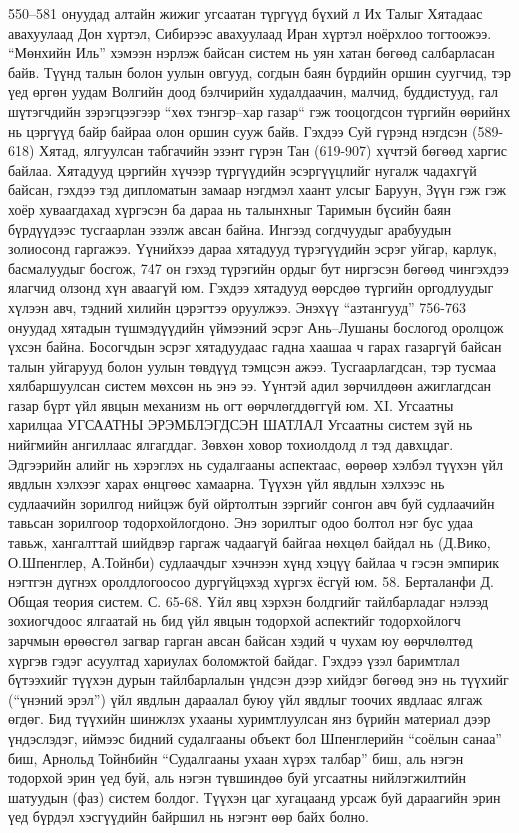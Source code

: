 550–581 онуудад алтайн жижиг угсаатан түргүүд бүхий л Их Талыг Хятадаас авахуулаад Дон хүртэл, Сибирээс авахуулаад Иран хүртэл ноёрхлоо тогтоожээ. “Мөнхийн Иль” хэмээн нэрлэж байсан систем нь уян хатан бөгөөд салбарласан байв. Түүнд талын болон уулын овгууд, согдын баян бүрдийн оршин суугчид, тэр үед өргөн уудам Волгийн доод бэлчирийн худалдаачин, малчид, буддистууд, гал шүтэгчдийн зэрэгцээгээр “хөх тэнгэр–хар газар“ гэж тооцогдсон түргийн өөрийнх нь цэргүүд байр байраа олон оршин сууж байв. Гэхдээ Суй гүрэнд нэгдсэн (589-618) Хятад, ялгуулсан табгачийн эзэнт гүрэн Тан (619-907) хүчтэй бөгөөд харгис байлаа. Хятадууд цэргийн хүчээр түргүүдийн эсэргүүцлийг нугалж чадахгүй байсан, гэхдээ тэд дипломатын замаар нэгдмэл хаант улсыг Баруун, Зүүн гэж гэж хоёр хуваагдахад хүргэсэн ба дараа нь талынхныг Таримын бүсийн баян бүрдүүдээс тусгаарлан эзэлж авсан байна. Ингээд согдчуудыг арабуудын золиосонд гаргажээ. Үүнийхээ дараа хятадууд түрэгүүдийн эсрэг уйгар, карлук, басмалуудыг босгож, 747 он гэхэд түрэгийн ордыг бут ниргэсэн бөгөөд чингэхдээ ялагчид олзонд хүн аваагүй юм. Гэхдээ хятадууд өөрсдөө түргийн оргодлуудыг хүлээн авч, тэдний хилийн цэрэгтээ оруулжээ. Энэхүү “азтангууд” 756-763 онуудад хятадын түшмэдүүдийн үймээний эсрэг Ань–Лушаны бослогод оролцож үхсэн байна. Босогчдын эсрэг хятадуудаас гадна хаашаа ч гарах газаргүй байсан талын уйгарууд болон уулын төвдүүд тэмцсэн ажээ. Тусгаарлагдсан, тэр тусмаа хялбаршуулсан систем мөхсөн нь энэ ээ. Үүнтэй адил зөрчилдөөн ажиглагдсан газар бүрт үйл явцын механизм нь огт өөрчлөгддөггүй юм.
XI. Угсаатны харилцаа
УГСААТНЫ ЭРЭМБЛЭГДСЭН ШАТЛАЛ
Угсаатны систем зүй нь нийгмийн ангиллаас ялгагддаг. Зөвхөн ховор тохиолдолд л тэд давхцдаг. Эдгээрийн алийг нь хэрэглэх нь судалгааны аспектаас, өөрөөр хэлбэл түүхэн үйл явдлын хэлхээг харах өнцгөөс хамаарна. Түүхэн үйл явдлын хэлхээс нь судлаачийн зорилгод нийцэж буй ойртолтын зэргийг сонгон авч буй судлаачийн тавьсан зорилгоор тодорхойлогдоно. Энэ зорилтыг одоо болтол нэг бус удаа тавьж, хангалттай шийдвэр гаргаж чадаагүй байгаа нөхцөл байдал нь (Д.Вико, О.Шпенглер, А.Тойнби) судлаачдыг хэчнээн хүнд хэцүү байлаа ч гэсэн эмпирик нэгтгэн дүгнэх оролдлогоосоо дургүйцэхэд хүргэх ёсгүй юм. 58. Берталанфи Д. Общая теория систем. С. 65-68.
Үйл явц хэрхэн болдгийг тайлбарладаг нэлээд зохиогчдоос ялгаатай нь бид үйл явцын тодорхой аспектийг тодорхойлогч зарчмын өрөөсгөл загвар гарган авсан байсан хэдий ч чухам юу өөрчлөлтөд хүргэв гэдэг асуултад хариулах боломжтой байдаг. Гэхдээ үзэл баримтлал бүтээхийг түүхэн дурын тайлбарлалын үндсэн дээр хийдэг бөгөөд энэ нь түүхийг (“үнэний эрэл”) үйл явдлын дараалал буюу үйл явдлыг тоочих явдлаас ялгаж өгдөг. Бид түүхийн шинжлэх ухааны хуримтлуулсан янз бүрийн материал дээр үндэслэдэг, иймээс бидний судалгааны объект бол Шпенглерийн “соёлын санаа” биш, Арнольд Тойнбийн “Судалгааны ухаан хүрэх талбар” биш, аль нэгэн тодорхой эрин үед буй, аль нэгэн түвшиндөө буй угсаатны нийлэгжилтийн шатуудын (фаз) систем болдог. Түүхэн цаг хугацаанд урсаж буй дараагийн эрин үед бүрдэл хэсгүүдийн байршил нь нэгэнт өөр байх болно.
